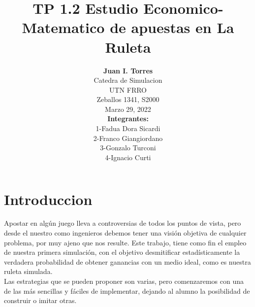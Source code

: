 \documentclass[onecolumn]{article}
\title{TP 1.2 Estudio Economico-Matematico de apuestas en La Ruleta} %
\author{%
\textbf{Juan I. Torres} \\[0.5ex] %
\normalsize Catedra de Simulacion \\ %
\normalsize UTN FRRO \\ %
\normalsize Zeballos 1341, S2000 \\ %
\normalsize Marzo 29, 2022 \\[1.5ex] %
\textbf{Integrantes:} \\  
\normalsize 1-Fadua Dora Sicardi \\
\normalsize 2-Franco Giangiordano \\
\normalsize 3-Gonzalo Turconi \\
\normalsize 4-Ignacio Curti\\
}
\date{}
\begin{document}
\maketitle
\section{Introduccion}
\normalsize Apostar en algún juego lleva a controversias de todos los puntos de vista, pero desde el nuestro como ingenieros debemos tener una visión objetiva de cualquier problema, por muy ajeno que nos resulte. Este trabajo, tiene como fin el empleo de nuestra primera simulación, con el objetivo desmitificar estadísticamente la verdadera probabilidad de obtener ganancias con un medio ideal, como es nuestra ruleta simulada. \\[2ex]
\normalsize Las estrategias que se pueden proponer son varias, pero comenzaremos con una de las más sencillas y fáciles de implementar, dejando al alumno la posibilidad de construir o imitar otras.\\[2ex]
\end{document}
